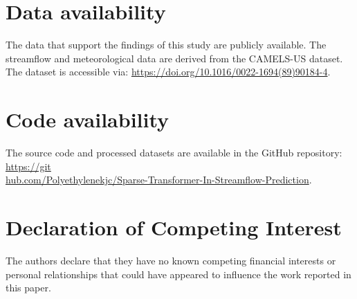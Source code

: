 \section*{Data availability}

The data that support the findings of this study are publicly available. The streamflow and meteorological data are derived from the CAMELS-US dataset\cite{CAMELS}. The dataset is accessible via: \href{https://doi.org/10.1016/0022-1694(89)90184-4}{https://doi.org/10.1016/0022-1694(89)90184-4}. 

\section*{Code availability}

The source code and processed datasets are available in the GitHub repository: \href{https://github.com/Polyethylenekjc/Sparse-Transformer-In-Streamflow-Prediction}{https://git\\hub.com/Polyethylenekjc/Sparse-Transformer-In-Streamflow-Prediction}.

%

\section*{Declaration of Competing Interest}

The authors declare that they have no known competing financial interests or personal relationships that could have appeared to influence the work reported in this paper.

